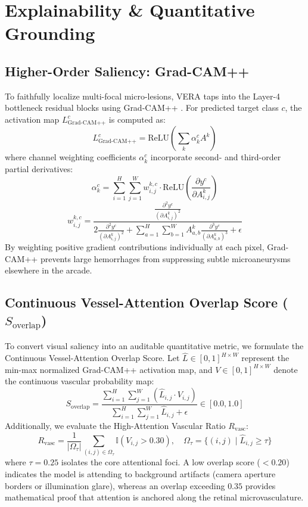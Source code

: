 \documentclass[conference]{IEEEtran}
\begin{document}
\section{Explainability \& Quantitative Grounding}

\subsection{Higher-Order Saliency: Grad-CAM++}
To faithfully localize multi-focal micro-lesions, VERA taps into the Layer-4 bottleneck residual blocks using Grad-CAM++ \cite{chattopadhay2018grad}. For predicted target class $c$, the activation map $L_{\text{Grad-CAM++}}^c$ is computed as:
\begin{equation}
    L_{\text{Grad-CAM++}}^c = \text{ReLU}\left( \sum_k \alpha_k^c A^k \right)
\end{equation}
where channel weighting coefficients $\alpha_k^c$ incorporate second- and third-order partial derivatives:
\begin{equation}
    \alpha_k^c = \sum_{i=1}^H \sum_{j=1}^W w_{i, j}^{k, c} \cdot \text{ReLU}\left( \frac{\partial y^c}{\partial A_{i, j}^k} \right)
\end{equation}
\begin{equation}
    w_{i, j}^{k, c} = \frac{\frac{\partial^2 y^c}{(\partial A_{i, j}^k)^2}}{2 \frac{\partial^2 y^c}{(\partial A_{i, j}^k)^2} + \sum_{a=1}^H \sum_{b=1}^W A_{a, b}^k \frac{\partial^3 y^c}{(\partial A_{a, b}^k)^3} + \epsilon}
\end{equation}
By weighting positive gradient contributions individually at each pixel, Grad-CAM++ prevents large hemorrhages from suppressing subtle microaneurysms elsewhere in the arcade.

\subsection{Continuous Vessel-Attention Overlap Score ($S_{\text{overlap}}$)}
To convert visual saliency into an auditable quantitative metric, we formulate the Continuous Vessel-Attention Overlap Score. Let $\hat{L} \in [0, 1]^{H \times W}$ represent the min-max normalized Grad-CAM++ activation map, and $V \in [0, 1]^{H \times W}$ denote the continuous vascular probability map:
\begin{equation}
    S_{\text{overlap}} = \frac{\sum_{i=1}^H \sum_{j=1}^W \left( \hat{L}_{i, j} \cdot V_{i, j} \right)}{\sum_{i=1}^H \sum_{j=1}^W \hat{L}_{i, j} + \epsilon} \in [0.0, 1.0]
\end{equation}
Additionally, we evaluate the High-Attention Vascular Ratio $R_{\text{vasc}}$:
\begin{equation}
    R_{\text{vasc}} = \frac{1}{|\Omega_\tau|} \sum_{(i, j) \in \Omega_\tau} \mathbb{I}(V_{i, j} > 0.30), \quad \Omega_\tau = \{(i, j) \mid \hat{L}_{i, j} \ge \tau\}
\end{equation}
where $\tau = 0.25$ isolates the core attentional foci. A low overlap score ($<0.20$) indicates the model is attending to background artifacts (camera aperture borders or illumination glare), whereas an overlap exceeding $0.35$ provides mathematical proof that attention is anchored along the retinal microvasculature.
\end{document}
